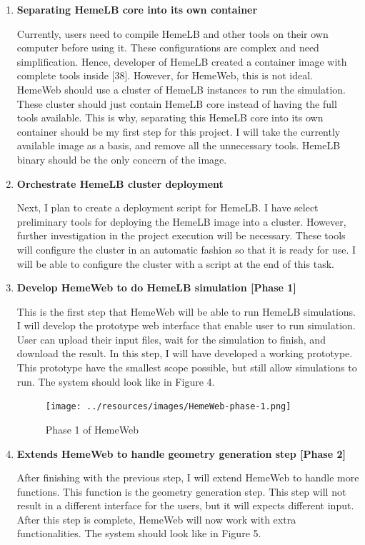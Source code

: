 \documentclass[]{article}
\begin{document}
\begin{enumerate}
\def\labelenumi{\arabic{enumi}.}
\item
  \textbf{Separating HemeLB core into its own container}

  Currently, users need to compile HemeLB and other tools on their own
  computer before using it. These configurations are complex and need
  simplification. Hence, developer of HemeLB created a container image
  with complete tools inside {[}38{]}. However, for HemeWeb, this is not
  ideal. HemeWeb should use a cluster of HemeLB instances to run the
  simulation. These cluster should just contain HemeLB core instead of
  having the full tools available. This is why, separating this HemeLB
  core into its own container should be my first step for this project.
  I will take the currently available image as a basis, and remove all
  the unnecessary tools. HemeLB binary should be the only concern of the
  image.
\item
  \textbf{Orchestrate HemeLB cluster deployment}

  Next, I plan to create a deployment script for HemeLB. I have select
  preliminary tools for deploying the HemeLB image into a cluster.
  However, further investigation in the project execution will be
  necessary. These tools will configure the cluster in an automatic
  fashion so that it is ready for use. I will be able to configure the
  cluster with a script at the end of this task.
\item
  \textbf{Develop HemeWeb to do HemeLB simulation {[}Phase 1{]}}

  This is the first step that HemeWeb will be able to run HemeLB
  simulations. I will develop the prototype web interface that enable
  user to run simulation. User can upload their input files, wait for
  the simulation to finish, and download the result. In this step, I
  will have developed a working prototype. This prototype have the
  smallest scope possible, but still allow simulations to run. The
  system should look like in Figure 4.

  \begin{figure}[H]
  \centering
  \texttt{[image: ../resources/images/HemeWeb-phase-1.png]}
  \caption{Phase 1 of HemeWeb}
  \end{figure}
\item
  \textbf{Extends HemeWeb to handle geometry generation step {[}Phase
  2{]}}

  After finishing with the previous step, I will extend HemeWeb to
  handle more functions. This function is the geometry generation step.
  This step will not result in a different interface for the users, but
  it will expects different input. After this step is complete, HemeWeb
  will now work with extra functionalities. The system should look like
  in Figure 5.


\end{enumerate}
\end{document}

